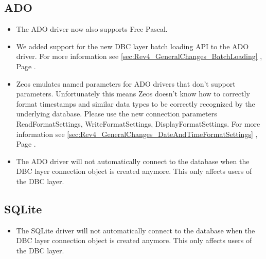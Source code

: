 \documentclass[a4paper,12pt,oneside]{book}
\begin{document}
\subsection{ADO}
\label{sec:Rev4_DriverSpecificChanges_Ado}
\begin{itemize}
\item
  The ADO driver now also supports Free Pascal.
\item
  We added support for the new DBC layer batch loading API to the ADO driver.
	For more information see \ref{sec:Rev4_GeneralChanges_BatchLoading} , Page \pageref{sec:Rev4_GeneralChanges_BatchLoading}.
\item
  Zeos emulates named parameters for ADO drivers that don't support parameters.
	Unfortunately this means Zeos doesn't know how to correctly format timestamps and similar data types to be correctly recognized by the underlying database.
	Please use the new connection parameters ReadFormatSettings, WriteFormatSettings, DisplayFormatSettings.
	For more information see \ref{sec:Rev4_GeneralChanges_DateAndTimeFormatSettings} , Page \pageref{sec:Rev4_GeneralChanges_DateAndTimeFormatSettings}.
\item
  The ADO driver will not automatically connect to the database when the DBC layer connection object is created anymore.
	This only affects users of the DBC layer.	
\end{itemize}

\subsection{SQLite}
\begin{itemize}
\item
  The SQLite driver will not automatically connect to the database when the DBC layer connection object is created anymore.
	This only affects users of the DBC layer.
\end{itemize}
\end{document}
